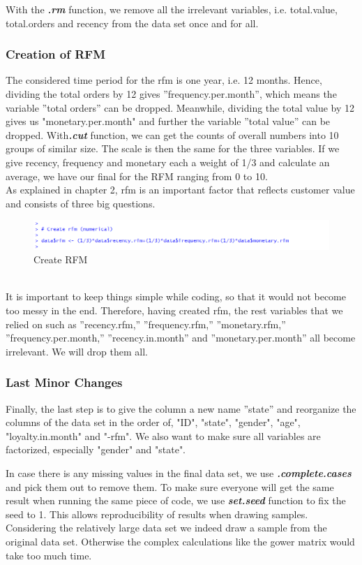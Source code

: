 \documentclass[a4paper,12pt,fleqn]{article}
\begin{document}
With the \textbf{\textit{.rm}} function, we remove all the irrelevant variables, i.e. total.value, total.orders and recency from the data set once and for all.

\subsubsection{Creation of RFM} 
The considered time period for the rfm is one year, i.e. 12 months. Hence, dividing the total orders by 12 gives ''frequency.per.month'', which means the variable ''total orders'' can be dropped. Meanwhile, dividing the total value by 12 gives us "monetary.per.month" and further the variable ''total value'' can be dropped. With\textbf{\textit{.cut}} function, we can get the counts of overall numbers into 10 groups of similar size. The scale is then the same for the three variables. If we give recency, frequency and monetary each a weight of 1/3 and calculate an average, we have our final for the RFM ranging from 0 to 10. \\
As explained in chapter 2, rfm is an important factor that reflects customer value and consists of three big questions.\\
\begin{figure}[h]
	\centering
	\includegraphics[width=0.95\linewidth]{"6.create rfm"}
	\caption{Create RFM}
	\label{fig:6}
\end{figure}\\
It is important to keep things simple while coding, so that it would not become too messy in the end. Therefore, having created rfm, the rest variables that we relied on such as ''recency.rfm,'' ''frequency.rfm,'' ''monetary.rfm,'' ''frequency.per.month,'' ''recency.in.month'' and ''monetary.per.month'' all become irrelevant. We will drop them all.

\subsubsection{Last Minor Changes}
Finally, the last step is to give the column a new name ''state'' and reorganize the columns of the data set in the order of, "ID", "state", "gender", "age", "loyalty.in.month" and "-rfm". We also want to make sure all variables are factorized, especially "gender" and "state".

In case there is any missing values in the final data set, we use \textbf{\textit{.complete.cases}} and pick them out to remove them. To make sure everyone will get the same result when running the same piece of code, we use \textbf{\textit{set.seed}} function to fix the seed to 1. This allows reproducibility of results when drawing samples. Considering the relatively large data set we indeed draw a sample from the original data set. Otherwise the complex calculations like the gower matrix would take too much time.
\end{document}
